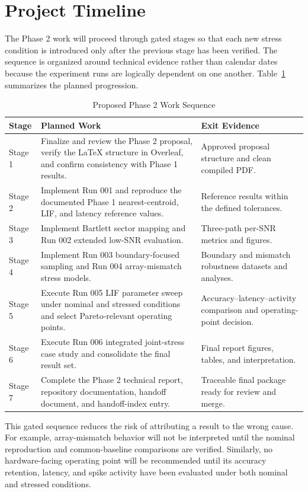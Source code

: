 \section{Project Timeline}

The Phase 2 work will proceed through gated stages so that each new stress condition is introduced only after the previous stage has been verified. The sequence is organized around technical evidence rather than calendar dates because the experiment runs are logically dependent on one another. Table~\ref{tab:phase2_timeline} summarizes the planned progression.

\begin{table}[H]
\centering
\caption{Proposed Phase 2 Work Sequence}
\label{tab:phase2_timeline}
\begin{tabular}{p{} p{} p{}}
\toprule
Stage & Planned Work & Exit Evidence \\
\midrule
Stage 1 & Finalize and review the Phase 2 proposal, verify the LaTeX structure in Overleaf, and confirm consistency with Phase 1 results. & Approved proposal structure and clean compiled PDF. \\
Stage 2 & Implement Run 001 and reproduce the documented Phase 1 nearest-centroid, LIF, and latency reference values. & Reference results within the defined tolerances. \\
Stage 3 & Implement Bartlett sector mapping and Run 002 extended low-SNR evaluation. & Three-path per-SNR metrics and figures. \\
Stage 4 & Implement Run 003 boundary-focused sampling and Run 004 array-mismatch stress models. & Boundary and mismatch robustness datasets and analyses. \\
Stage 5 & Execute Run 005 LIF parameter sweep under nominal and stressed conditions and select Pareto-relevant operating points. & Accuracy--latency--activity comparison and operating-point decision. \\
Stage 6 & Execute Run 006 integrated joint-stress case study and consolidate the final result set. & Final report figures, tables, and interpretation. \\
Stage 7 & Complete the Phase 2 technical report, repository documentation, handoff document, and handoff-index entry. & Traceable final package ready for review and merge. \\
\bottomrule
\end{tabular}
\end{table}

This gated sequence reduces the risk of attributing a result to the wrong cause. For example, array-mismatch behavior will not be interpreted until the nominal reproduction and common-baseline comparisons are verified. Similarly, no hardware-facing operating point will be recommended until its accuracy retention, latency, and spike activity have been evaluated under both nominal and stressed conditions.